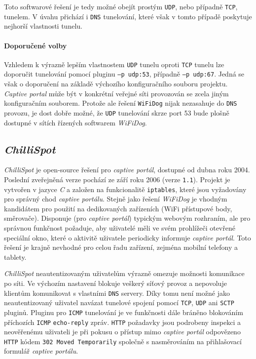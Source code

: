 \documentclass[thesis=M,czech]{FITthesis}[2012/10/20]
\begin{document}
Toto softwarové řešení je tedy možné obejít prostým \texttt{UDP}, nebo případně \texttt{TCP}, tunelem. V úvahu přichází i \texttt{DNS} tunelování, které však v tomto případě poskytuje nejhorší vlastnosti tunelu.


\paragraph{Doporučené volby} Vzhledem k výrazně lepším vlastnostem \texttt{UDP} tunelu oproti \texttt{TCP} tunelu lze doporučit tunelování pomocí pluginu \texttt{--p udp:53}, případně \texttt{--p udp:67}. Jedná se však o doporučení na základě výchozího konfiguračního souboru projektu. \textit{Captive portal} může být v konkrétní veřejné síti provozován se zcela jiným konfiguračním souborem. Protože ale řešení \texttt{WiFiDog} nijak nezasahuje do \texttt{DNS} provozu, je dost dobře možné, že \texttt{UDP} tunelování skrze port 53 bude plošně dostupné v sítích řízených softwarem \textit{WiFiDog}.


\subsection{\textit{ChilliSpot}}

\textit{ChilliSpot} je open-source řešení pro \textit{captive portál}, dostupné od dubna roku 2004. Poslední zveřejněná verze pochází ze září roku 2006 (verze \texttt{1.1}). Projekt je vytvořen v jazyce \textit{C} a založen na funkcionalitě \texttt{iptables}, které jsou vyžadovány pro správný chod \textit{captive portálu}. Stejně jako řešení \textit{WiFiDog} je vhodným kandidátem pro použití na dedikovaných zařízeních (WiFi přístupové body, směrovače). Disponuje (pro \textit{captive portál}) typickým webovým rozhraním, ale pro správnou funkčnost požaduje, aby uživatelé měli ve svém prohlížeči otevřené speciální okno, které o aktivitě uživatele periodicky informuje \textit{captive portál}. Toto řešení je krajně nevhodné pro celou řadu zařízení, zejména mobilní telefony a tablety. 

\textit{ChilliSpot} neautentizovaným uživatelům výrazně omezuje možnosti komunikace po síti. Ve výchozím nastavení blokuje veškerý síťový provoz a nepovoluje klientům komunikovat s vlastními \texttt{DNS} servery. Díky tomu není možné jako neautentizovaný uživatel navázat tunelové spojení pomocí \texttt{TCP}, \texttt{UDP} ani \texttt{SCTP} pluginů. Pluginu pro \texttt{ICMP} tunelování je ve funkčnosti dále bráněno blokováním příchozích \texttt{ICMP} \texttt{echo-reply} zpráv. \texttt{HTTP} požadavky jsou podrobeny inspekci a neověřenému uživateli je při pokusu o přístup mimo \textit{captive portál} odpovězeno \texttt{HTTP} kódem \texttt{302 Moved Temporarily} společně s nasměrováním na přihlašovací formulář \textit{captive portálu}.
\end{document}
